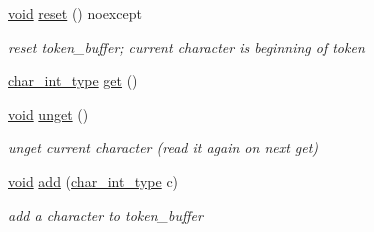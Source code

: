 \begin{DoxyCompactItemize}
\item 
\hyperlink{namespacenlohmann_1_1detail_a59fca69799f6b9e366710cb9043aa77d}{void} \hyperlink{classnlohmann_1_1detail_1_1lexer_a3bda093837339813916d11fb6e396606}{reset} () noexcept
\begin{DoxyCompactList}\small\item\em reset token\+\_\+buffer; current character is beginning of token \end{DoxyCompactList}\item 
\hyperlink{classnlohmann_1_1detail_1_1lexer_a46612a81a07dbbc6daef870ca4f959e4}{char\+\_\+int\+\_\+type} \hyperlink{classnlohmann_1_1detail_1_1lexer_a9cd3e4cf04d19be521beb8868c1a2fc9}{get} ()
\item 
\hyperlink{namespacenlohmann_1_1detail_a59fca69799f6b9e366710cb9043aa77d}{void} \hyperlink{classnlohmann_1_1detail_1_1lexer_ab5811afe1c3efb0b769f7733b8373c6f}{unget} ()
\begin{DoxyCompactList}\small\item\em unget current character (read it again on next get) \end{DoxyCompactList}\item 
\hyperlink{namespacenlohmann_1_1detail_a59fca69799f6b9e366710cb9043aa77d}{void} \hyperlink{classnlohmann_1_1detail_1_1lexer_a36ffc3c33c3aea18291ead7a30fa7cc6}{add} (\hyperlink{classnlohmann_1_1detail_1_1lexer_a46612a81a07dbbc6daef870ca4f959e4}{char\+\_\+int\+\_\+type} c)
\begin{DoxyCompactList}\small\item\em add a character to token\+\_\+buffer \end{DoxyCompactList}\end{DoxyCompactItemize}
